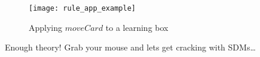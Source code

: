 \begin{figure}[htp] 
\begin{center}
  \texttt{[image: rule\_app\_example]}
  \caption[]{Applying $moveCard$ to a learning box}
  \label{fig:rule_app_example}
\end{center}
\end{figure}

Enough theory! Grab your mouse and lets get cracking with SDMs\ldots
